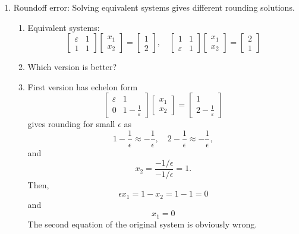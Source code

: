\documentclass{article}
\theoremstyle{remark}
\begin{document}
\begin{enumerate}
\item Roundoff error: Solving equivalent systems gives different rounding solutions.
\begin{enumerate}
\item Equivalent systems: 
$$
\begin{bmatrix}
\varepsilon & 1\\
1 & 1
\end{bmatrix}
\begin{bmatrix}
x_1\\x_2
\end{bmatrix} = \begin{bmatrix}
1\\2
\end{bmatrix},\quad 
\begin{bmatrix}
1 & 1\\
\varepsilon & 1
\end{bmatrix}
\begin{bmatrix}
x_1\\x_2
\end{bmatrix} = \begin{bmatrix}
2\\1
\end{bmatrix}
$$
\item Which version is better?
\item First version has echelon form
$$
\begin{bmatrix}
\varepsilon & 1\\
0 & 1-\displaystyle \frac{1}{\varepsilon}
\end{bmatrix}
\begin{bmatrix}
x_1\\x_2
\end{bmatrix} = \begin{bmatrix}
1\\2 - \displaystyle \frac{1}{\varepsilon}
\end{bmatrix}
$$
gives rounding for small $\epsilon$ as
\[
1- \frac{1}{\epsilon} \approx -\frac{1}{\epsilon}, \quad 
2- \frac{1}{\epsilon} \approx -\frac{1}{\epsilon}, 
\]
and 
\[
x_2 = \frac{-1/\epsilon}{-1/\epsilon} = 1.
\]
Then, 
\[
\epsilon x_1 = 1-x_2 = 1-1 = 0
\]
and 
\[
x_1 = 0
\]
The second equation of the original system is obviously wrong.


\end{enumerate}
\end{enumerate}
\end{document}
